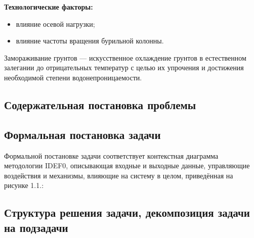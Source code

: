 \textbf{Технологические факторы:}
\begin{itemize}
  \item влияние осевой нагрузки;
  \item влияние частоты вращения бурильной колонны.
\end{itemize}

Замораживание грунтов — искусственное охлаждение грунтов в естественном залегании до отрицательных температур с целью их упрочения и достижения необходимой степени водонепроницаемости.




\subsection{Содержательная постановка проблемы}

\subsection{Формальная постановка задачи}
Формальной постановке задачи соответствует контекстная диаграмма методологии IDEF0, описывающая входные и выходные данные, управляющие воздействия и механизмы,
влияющие на систему в целом, приведённая на рисунке 1.1.:

\subsection{Структура решения задачи, декомпозиция задачи на подзадачи}

